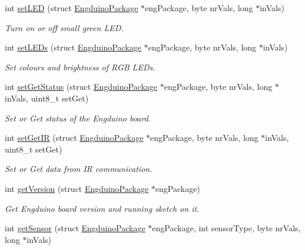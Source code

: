 \begin{DoxyCompactItemize}
int \hyperlink{group___engduino_protocol_ga4f6f6185d9345303466934fb97f5e5f3}{set\+L\+E\+D} (struct \hyperlink{struct_engduino_package}{Engduino\+Package} $\ast$eng\+Package, byte nr\+Vals, long $\ast$in\+Vals)
\begin{DoxyCompactList}\small\item\em Turn on or off small green L\+E\+D. \end{DoxyCompactList}\item 
int \hyperlink{group___engduino_protocol_ga429539daf1580716935d0f4c9fee60a7}{set\+L\+E\+Ds} (struct \hyperlink{struct_engduino_package}{Engduino\+Package} $\ast$eng\+Package, byte nr\+Vals, long $\ast$in\+Vals)
\begin{DoxyCompactList}\small\item\em Set colours and brightness of R\+G\+B L\+E\+Ds. \end{DoxyCompactList}\item 
int \hyperlink{group___engduino_protocol_gac1faeb0dc90fcacd10ee643c3a45f82f}{set\+Get\+Status} (struct \hyperlink{struct_engduino_package}{Engduino\+Package} $\ast$eng\+Package, byte nr\+Vals, long $\ast$in\+Vals, uint8\+\_\+t set\+Get)
\begin{DoxyCompactList}\small\item\em Set or Get status of the Engduino board. \end{DoxyCompactList}\item 
int \hyperlink{group___engduino_protocol_ga04358743c2b3e13ff61eb072d57e782a}{set\+Get\+I\+R} (struct \hyperlink{struct_engduino_package}{Engduino\+Package} $\ast$eng\+Package, byte nr\+Vals, long $\ast$in\+Vals, uint8\+\_\+t set\+Get)
\begin{DoxyCompactList}\small\item\em Set or Get data from I\+R communication. \end{DoxyCompactList}\item 
int \hyperlink{group___engduino_protocol_gad585cd4ca7ea413a137fe5783825a612}{get\+Version} (struct \hyperlink{struct_engduino_package}{Engduino\+Package} $\ast$eng\+Package)
\begin{DoxyCompactList}\small\item\em Get Engduino board version and running sketch on it. \end{DoxyCompactList}\item 
int \hyperlink{group___engduino_protocol_ga504071d488f9d2a9ace156c4523ea18d}{get\+Sensor} (struct \hyperlink{struct_engduino_package}{Engduino\+Package} $\ast$eng\+Package, int sensor\+Type, byte nr\+Vals, long $\ast$in\+Vals)

\end{DoxyCompactItemize}
